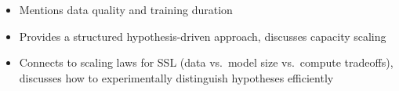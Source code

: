 \begin{interviewq}

\goodgreat
\begin{itemize}
    \item {} Mentions data quality and training duration
    \item {} Provides a structured hypothesis-driven approach, discusses capacity scaling
    \item {} Connects to scaling laws for SSL (data vs.\ model size vs.\ compute tradeoffs), discusses how to experimentally distinguish hypotheses efficiently
\end{itemize}

\end{interviewq}

